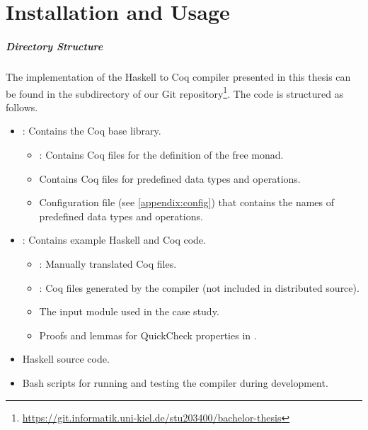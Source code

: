 \chapter{Installation and Usage} \label{appendix:usage}

\paragraph{Directory Structure}
The implementation of the Haskell to Coq compiler presented in this thesis can be found in the  subdirectory of our Git repository\footnote{\url{https://git.informatik.uni-kiel.de/stu203400/bachelor-thesis}}.
The code is structured as follows.
\begin{itemize}
  \item {}: Contains the Coq base library.
    \begin{itemize}
      \item {}: Contains Coq files for the definition of the free monad.
      \item {} Contains Coq files for predefined data types and operations.
      \item {} Configuration file (see \autoref{appendix:config}) that contains the names of predefined data types and operations.
    \end{itemize}
  \item {}: Contains example Haskell and Coq code.
    \begin{itemize}
      \item {}: Manually translated Coq files.
      \item {}: Coq files generated by the compiler (not included in distributed source).
      \item {} The input module used in the case study.
      \item {} Proofs and lemmas for QuickCheck properties in .
    \end{itemize}
  \item {} Haskell source code.
  \item {} Bash scripts for running and testing the compiler during development.
\end{itemize}

